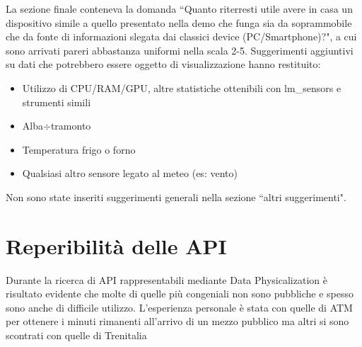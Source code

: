 \documentclass[12pt,a4paper]{report}
\begin{document}
La sezione finale conteneva la domanda ``Quanto riterresti utile avere in casa un dispositivo simile a quello presentato nella demo che
funga sia da soprammobile che da fonte di informazioni slegata dai classici device (PC/Smartphone)?", a cui sono arrivati pareri abbastanza
uniformi nella scala 2-5. Suggerimenti aggiuntivi su dati che potrebbero essere oggetto di visualizzazione hanno restituito:
\begin{itemize}
  \item Utilizzo di CPU/RAM/GPU, altre statistiche ottenibili con lm_sensors e strumenti simili
  \item Alba$\div$tramonto
  \item Temperatura frigo o forno
  \item Qualsiasi altro sensore legato al meteo (es: vento)
\end{itemize}
Non sono state inseriti suggerimenti generali nella sezione ``altri suggerimenti".

\section{Reperibilità delle API}
Durante la ricerca di API rappresentabili mediante Data Physicalization è risultato evidente che molte di quelle più congeniali non
sono pubbliche e spesso sono anche di difficile utilizzo. L'esperienza personale è stata con quelle di ATM per ottenere i minuti rimanenti
all'arrivo di un mezzo pubblico ma altri si sono scontrati con quelle di Trenitalia \cite{trenitaliashock}
\end{document}
